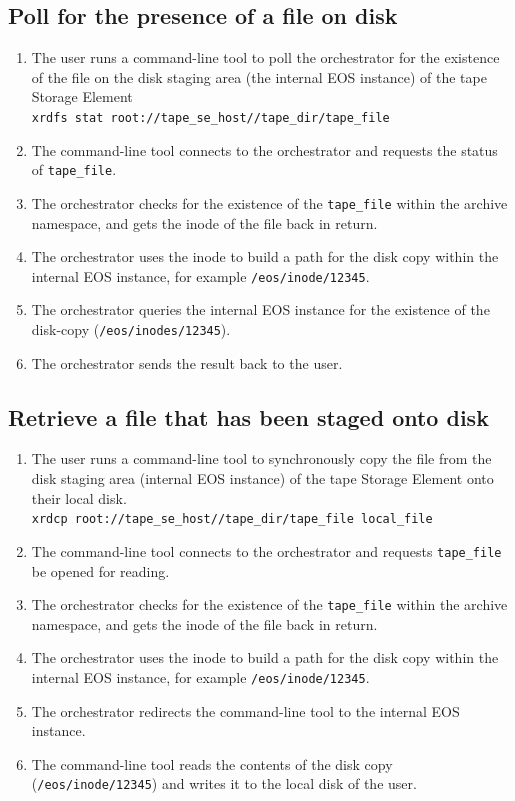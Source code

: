 \documentclass{article}
\begin{document}
\subsection{Poll for the presence of a file on disk}
\begin{enumerate}
	\item The user runs a command-line tool to poll the orchestrator for the existence of the file on the disk staging area (the internal EOS instance) of the tape Storage Element\\
	\texttt{xrdfs stat root://tape\_se\_host//tape\_dir/tape\_file}
	\item The command-line tool connects to the orchestrator and requests the status of \texttt{tape\_file}.
	\item The orchestrator checks for the existence of the \texttt{tape\_file} within the archive namespace, and gets the inode of the file back in return.
	\item The orchestrator uses the inode to build a path for the disk copy within the internal EOS instance, for example \texttt{/eos/inode/12345}.
	\item The orchestrator queries the internal EOS instance for the existence of the disk-copy (\texttt{/eos/inodes/12345}).
	\item The orchestrator sends the result back to the user.
\end{enumerate}

\subsection{Retrieve a file that has been staged onto disk}
\begin{enumerate}
	\item The user runs a command-line tool to synchronously copy the file from the disk staging area (internal EOS instance) of the tape Storage Element onto their local disk.\\
	\texttt{xrdcp root://tape\_se\_host//tape\_dir/tape\_file local\_file}
	\item The command-line tool connects to the orchestrator and requests \texttt{tape\_file} be opened for reading.
	\item The orchestrator checks for the existence of the \texttt{tape\_file} within the archive namespace, and gets the inode of the file back in return.
	\item The orchestrator uses the inode to build a path for the disk copy within the internal EOS instance, for example \texttt{/eos/inode/12345}.
	\item The orchestrator redirects the command-line tool to the internal EOS instance.
	\item The command-line tool reads the contents of the disk copy (\texttt{/eos/inode/12345}) and writes it to the local disk of the user.
\end{enumerate}
\end{document}
